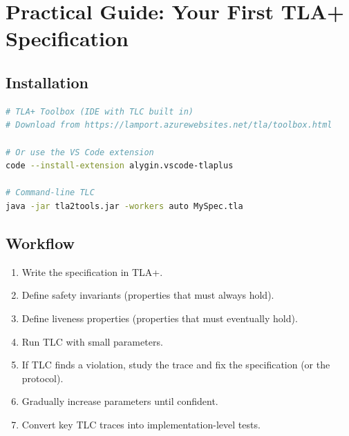 \section{Practical Guide: Your First TLA+ Specification}


\subsection{Installation}

\begin{lstlisting}[language=bash,caption={Installing TLA+ tools}]
# TLA+ Toolbox (IDE with TLC built in)
# Download from https://lamport.azurewebsites.net/tla/toolbox.html

# Or use the VS Code extension
code --install-extension alygin.vscode-tlaplus

# Command-line TLC
java -jar tla2tools.jar -workers auto MySpec.tla
\end{lstlisting}

\subsection{Workflow}

\begin{enumerate}
  \item Write the specification in TLA+.
  \item Define safety invariants (properties that must always hold).
  \item Define liveness properties (properties that must eventually hold).
  \item Run TLC with small parameters.
  \item If TLC finds a violation, study the trace and fix the specification (or the protocol).
  \item Gradually increase parameters until confident.
  \item Convert key TLC traces into implementation-level tests.
\end{enumerate}

